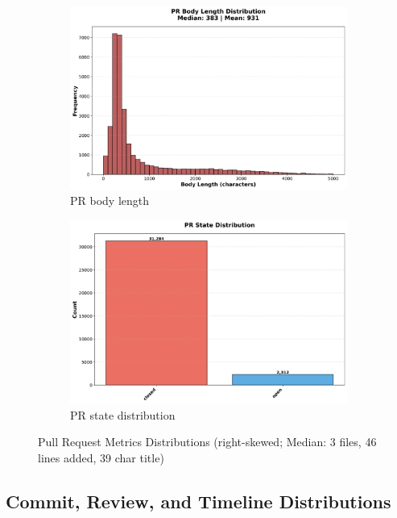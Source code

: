 \documentclass[11pt]{article}
\begin{document}
\begin{figure}[H]
\begin{subfigure}[b]{0.48\textwidth}
\centering
\includegraphics[width=\textwidth]{figures_individual/08_pr_body_length_histogram.png}
\caption{PR body length}
\label{fig:pr_body}
\end{subfigure}
\hfill
\begin{subfigure}[b]{0.48\textwidth}
\centering
\includegraphics[width=\textwidth]{figures_individual/09_pr_state_distribution.png}
\caption{PR state distribution}
\label{fig:pr_state}
\end{subfigure}

\caption{Pull Request Metrics Distributions (right-skewed; Median: 3 files, 46 lines added, 39 char title)}
\label{fig:pr_distributions_all}
\end{figure}

\subsection{Commit, Review, and Timeline Distributions}
\end{document}
